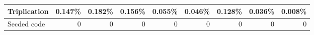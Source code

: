 \begin{table}
\begin{tabular}{lrrrrrrrr}
\hline
Triplication              & 0.147\%                                      & 0.182\%                                       & 0.156\%                                      & 0.055\%                                      & 0.046\%                                      & 0.128\%                                       & 0.036\%                                      & 0.008\%                                       \\
\hline
Secded code               & 0                                              & 0                                              & 0                                              & 0                                              & 0                                              & 0                                              & 0                                              & 0  \\         
\hline
\end{tabular}
\end{table}

